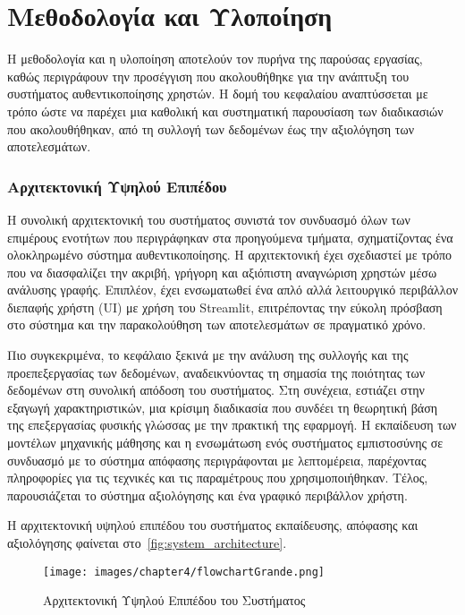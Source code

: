 \chapter{Μεθοδολογία και Υλοποίηση}
\label{chapter:implementations}

Η μεθοδολογία και η υλοποίηση αποτελούν τον πυρήνα της παρούσας εργασίας, καθώς περιγράφουν την προσέγγιση που ακολουθήθηκε για την ανάπτυξη του συστήματος αυθεντικοποίησης χρηστών. Η δομή του κεφαλαίου αναπτύσσεται με τρόπο ώστε να παρέχει μια καθολική και συστηματική παρουσίαση των διαδικασιών που ακολουθήθηκαν, από τη συλλογή των δεδομένων έως την αξιολόγηση των αποτελεσμάτων.

\subsection{Αρχιτεκτονική Υψηλού Επιπέδου}
Η συνολική αρχιτεκτονική του συστήματος συνιστά τον συνδυασμό όλων των επιμέρους ενοτήτων που περιγράφηκαν στα προηγούμενα τμήματα, σχηματίζοντας ένα ολοκληρωμένο σύστημα αυθεντικοποίησης. Η αρχιτεκτονική έχει σχεδιαστεί με τρόπο που να διασφαλίζει την ακριβή, γρήγορη και αξιόπιστη αναγνώριση χρηστών μέσω ανάλυσης γραφής. Επιπλέον, έχει ενσωματωθεί ένα απλό αλλά λειτουργικό περιβάλλον διεπαφής χρήστη (UI) με χρήση του Streamlit, επιτρέποντας την εύκολη πρόσβαση στο σύστημα και την παρακολούθηση των αποτελεσμάτων σε πραγματικό χρόνο.

Πιο συγκεκριμένα, το κεφάλαιο ξεκινά με την ανάλυση της συλλογής και της προεπεξεργασίας των δεδομένων, αναδεικνύοντας τη σημασία της ποιότητας των δεδομένων στη συνολική απόδοση του συστήματος. Στη συνέχεια, εστιάζει στην εξαγωγή χαρακτηριστικών, μια κρίσιμη διαδικασία που συνδέει τη θεωρητική βάση της επεξεργασίας φυσικής γλώσσας με την πρακτική της εφαρμογή. Η εκπαίδευση των μοντέλων μηχανικής μάθησης και η ενσωμάτωση ενός συστήματος εμπιστοσύνης σε συνδυασμό με το σύστημα απόφασης περιγράφονται με λεπτομέρεια, παρέχοντας πληροφορίες για τις τεχνικές και τις παραμέτρους που χρησιμοποιήθηκαν. Τέλος, παρουσιάζεται το σύστημα αξιολόγησης και ένα γραφικό περιβάλλον χρήστη.

Η αρχιτεκτονική υψηλού επιπέδου του συστήματος εκπαίδευσης, απόφασης και αξιολόγησης φαίνεται στο~\autoref{fig:system_architecture}.

\begin{figure}[H]
    \centering
    \texttt{[image: images/chapter4/flowchartGrande.png]}
    \caption{Αρχιτεκτονική Υψηλού Επιπέδου του Συστήματος}
    \label{fig:system_architecture}
\end{figure}


